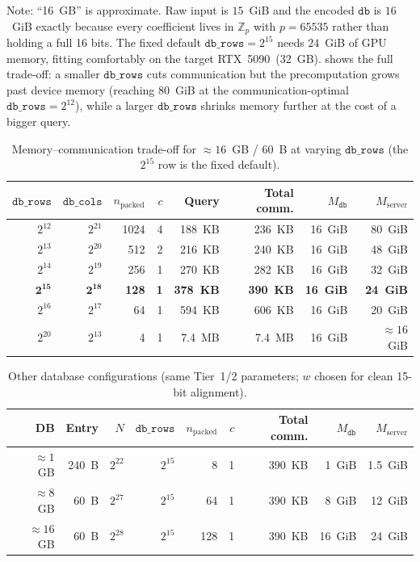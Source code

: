 \documentclass[11pt,a4paper]{article}
\newcommand{\Z}{\mathbb{Z}}
\begin{document}
Note: ``16~GB'' is approximate. Raw input is $15$~GiB and the encoded $\texttt{db}$ is $16$~GiB exactly because every coefficient lives in $\Z_p$ with $p = 65535$ rather than holding a full 16 bits.
The fixed default $\texttt{db\_rows} = 2^{15}$ needs $24$~GiB of GPU memory, fitting comfortably on the target RTX~5090~(32~GB).
 shows the full trade-off: a smaller $\texttt{db\_rows}$ cuts communication but the precomputation grows past device memory (reaching $80$~GiB at the communication-optimal $\texttt{db\_rows} = 2^{12}$), while a larger $\texttt{db\_rows}$ shrinks memory further at the cost of a bigger query.

\begin{table}[ht]\centering
\caption{Memory--communication trade-off for $\approx\!16$~GB / 60~B at varying $\texttt{db\_rows}$ (the $2^{15}$ row is the fixed default).}\label{tab:16gb-mem-tradeoff}
\begin{tabular}{@{}rrrrrrrr@{}}
\toprule
$\texttt{db\_rows}$ & $\texttt{db\_cols}$ & $n_{\mathrm{packed}}$ & $c$ & \textbf{Query} & \textbf{Total comm.} & $M_{\texttt{db}}$ & $M_{\mathrm{server}}$ \\
\midrule
$2^{12}$  & $2^{21}$ & 1024 & 4 & 188~KB &  236~KB & 16~GiB & 80~GiB \\
$2^{13}$  & $2^{20}$ &  512 & 2 & 216~KB &  240~KB & 16~GiB & 48~GiB \\
$2^{14}$  & $2^{19}$ &  256 & 1 & 270~KB &  282~KB & 16~GiB & 32~GiB \\
$\mathbf{2^{15}}$  & $\mathbf{2^{18}}$ &  \textbf{128} & \textbf{1} & \textbf{378~KB} &  \textbf{390~KB} & \textbf{16~GiB} & \textbf{24~GiB} \\
$2^{16}$  & $2^{17}$ &   64 & 1 & 594~KB &  606~KB & 16~GiB & 20~GiB \\
$2^{20}$  & $2^{13}$ &    4 & 1 & 7.4~MB &  7.4~MB & 16~GiB & $\approx 16$~GiB \\
\bottomrule
\end{tabular}
\end{table}

\begin{table}[ht]\centering
\caption{Other database configurations (same Tier~1/2 parameters; $w$ chosen for clean 15-bit alignment).}\label{tab:db-configs-other}
\begin{tabular}{@{}rrrrrrrrr@{}}
\toprule
\textbf{DB} & \textbf{Entry} & $N$ & $\texttt{db\_rows}$ & $n_{\mathrm{packed}}$ & $c$ & \textbf{Total comm.} & $M_{\texttt{db}}$ & $M_{\mathrm{server}}$ \\
\midrule
$\approx\!1$~GB  & 240~B & $2^{22}$ & $2^{15}$ &    8 & 1 & 390~KB &  1~GiB & 1.5~GiB \\
$\approx\!8$~GB  &  60~B & $2^{27}$ & $2^{15}$ &   64 & 1 & 390~KB &  8~GiB &  12~GiB \\
$\approx\!16$~GB &  60~B & $2^{28}$ & $2^{15}$ &  128 & 1 & 390~KB & 16~GiB &  24~GiB \\
\bottomrule
\end{tabular}
\end{table}
\end{document}
